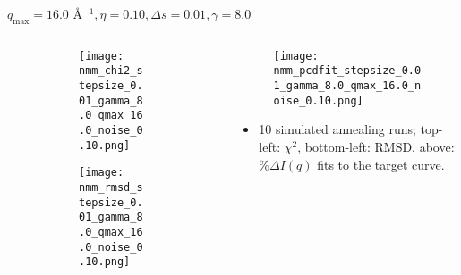 \documentclass{beamer}
\begin{document}
\begin{frame}{$ q_{\textrm{max}}=16.0 $ \AA $^{-1}, \eta=0.10, \Delta s=0.01, \gamma=8.0$}
	\begin{columns}
		\begin{column}{.5\textwidth}
			\begin{figure}[H]
			\centering
			\begin{subfigure}[b]{\textwidth}
				\centering
				\texttt{[image: nmm\_chi2\_stepsize\_0.01\_gamma\_8.0\_qmax\_16.0\_noise\_0.10.png]}
				\label{fig:}
			\end{subfigure}
			\begin{subfigure}[b]{\textwidth}
				\centering
				\texttt{[image: nmm\_rmsd\_stepsize\_0.01\_gamma\_8.0\_qmax\_16.0\_noise\_0.10.png]}
				\label{fig:}
			\end{subfigure}
			\end{figure}
		\end{column}
		\begin{column}{.5\textwidth}
			\begin{figure}[H]
				\centering
				\texttt{[image: nmm\_pcdfit\_stepsize\_0.01\_gamma\_8.0\_qmax\_16.0\_noise\_0.10.png]}
				\label{fig:}
			\end{figure}
			\begin{itemize}
				\item 10 simulated annealing runs; top-left: $\chi^2$, bottom-left: RMSD, above: $\%\Delta I(q)$ fits to the target curve.
			\end{itemize}
		\end{column}
	\end{columns}
\end{frame}
 
\end{document}
